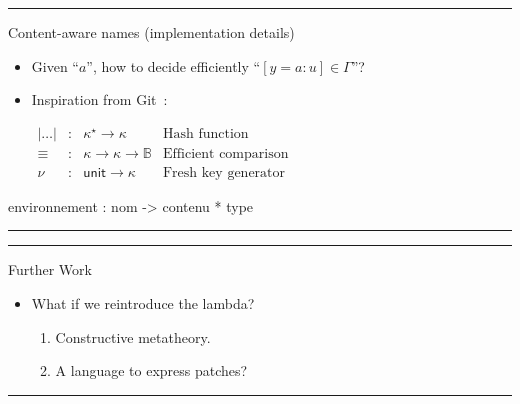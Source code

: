 \documentclass[ignorenonframetext,red]{beamer}
\begin{document}
\hrule
\begin{frame}{Content-aware names (implementation details)}
  
\begin{itemize}
\item Given ``$a$'', how to decide efficiently ``$[y = a : u] \in \Gamma$''?

\item Inspiration from \textsf{Git}~:
\begin{center}
\begin{math}
\begin{array}{lllr}
| \dots | &:& \kappa^\star \rightarrow \kappa & \text{Hash function}\\
\equiv    &:& \kappa \rightarrow \kappa \rightarrow \mathbb{B} & \text{Efficient comparison}\\
\nu       &:& \textsf{unit} \rightarrow \kappa & \text{Fresh key generator}
\end{array}
\end{math}
\end{center}
\end{itemize}


environnement : nom -> contenu * type

\end{frame}
\hrule


\hrule
\begin{frame}{Further Work}
  
\begin{itemize}
\item What if we reintroduce the lambda?
\begin{enumerate}
\item Constructive metatheory.
\item A language to express patches?
\end{enumerate}
\end{itemize}
\end{frame}
\hrule
\end{document}
